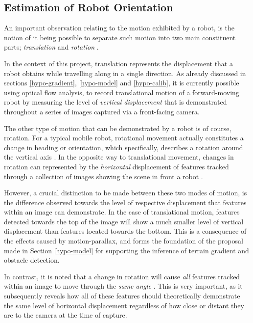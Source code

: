 \subsection{Estimation of Robot Orientation}
\label{hypo-rotation}
An important observation relating to the motion exhibited by a robot, is the notion of it being possible to separate such motion into two main constituent parts; \textit{translation} and \textit{rotation} \cite{campbell}. 

In the context of this project, translation represents the displacement that a robot obtains while travelling along in a single direction. As already discussed in sections \ref{hypo-gradient}, \ref{hypo-model} and \ref{hypo-calib}, it is currently possible using optical flow analysis, to record translational motion of a forward-moving robot by measuring the level of \textit{vertical displacement} that is demonstrated throughout a series of images captured via a front-facing camera.

The other type of motion that can be demonstrated by a robot is of course, rotation. For a typical mobile robot, rotational movement actually constitutes a change in heading or orientation, which specifically, describes a rotation around the vertical axis \cite{campbell}. In the opposite way to translational movement, changes in rotation can represented by the \textit{horizontal} displacement of features tracked through a collection of images showing the scene in front a robot \cite{labrosse}. 

However, a crucial distinction to be made between these two modes of motion, is the difference observed towards the level of respective displacement that features within an image can demonstrate. In the case of translational motion, features detected towards the top of the image will show a much smaller level of vertical displacement than features located towards the bottom. This is a consequence of the effects caused by motion-parallax, and forms the foundation of the proposal made in Section \ref{hypo-model} for supporting the inference of terrain gradient and obstacle detection. 

In contrast, it is noted that a change in rotation will cause \textit{all} features tracked within an image to move through the \textit{same angle} \cite{campbell}. This is very important, as it subsequently reveals how all of these features should theoretically demonstrate the same level of horizontal displacement regardless of how close or distant they are to the camera at the time of capture.

